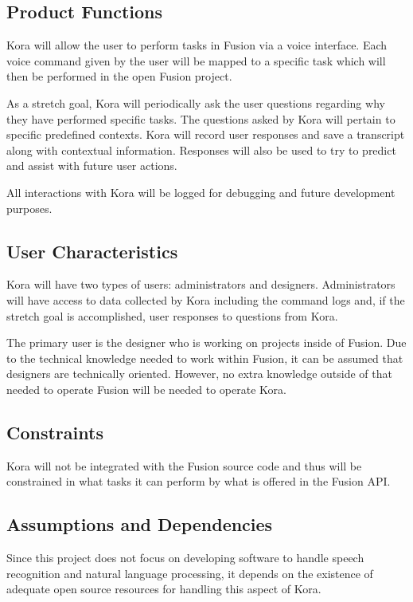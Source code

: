 \documentclass[onecolumn, draftclsnofoot,10pt, compsoc]{IEEEtran}
\def \botname{Kora\xspace}
\begin{document}
    \subsection{Product Functions}
        \botname will allow the user to perform tasks in Fusion via a voice interface. 
        Each voice command given by the user will be mapped to a specific task which will then be performed in the open Fusion project. 
       
        As a stretch goal, \botname will periodically ask the user questions regarding why they have performed specific tasks.
        The questions asked by \botname will pertain to specific predefined contexts.
		\botname will record user responses and save a transcript along with contextual information.
        Responses will also be used to try to predict and assist with future user actions. 

        All interactions with \botname will be logged for debugging and future development purposes.
        
    \subsection{User Characteristics}
		\botname will have two types of users: administrators and designers. 
		Administrators will have access to data collected by \botname including the command logs and, if the stretch goal is accomplished, user responses to questions from \botname. 
		
		The primary user is the designer who is working on projects inside of Fusion. 
        Due to the technical knowledge needed to work within Fusion, it can be assumed that designers are technically oriented.
        However, no extra knowledge outside of that needed to operate Fusion will be needed to operate \botname.
        
    \subsection{Constraints}
        \botname will not be integrated with the Fusion source code and thus will be constrained in what tasks it can perform by what is offered in the Fusion API. 

    \subsection{Assumptions and Dependencies}
        Since this project does not focus on developing software to handle speech recognition and natural language processing, it depends on the existence of adequate open source resources for handling this aspect of \botname. 
\end{document}
